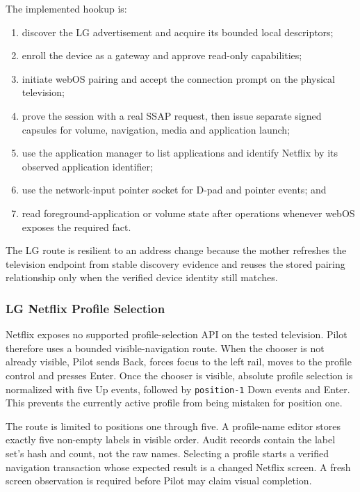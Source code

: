 The implemented hookup is:

\begin{enumerate}
  \item discover the LG advertisement and acquire its bounded local descriptors;
  \item enroll the device as a gateway and approve read-only capabilities;
  \item initiate webOS pairing and accept the connection prompt on the physical
        television;
  \item prove the session with a real SSAP request, then issue separate signed
        capsules for volume, navigation, media and application launch;
  \item use the application manager to list applications and identify Netflix by
        its observed application identifier;
  \item use the network-input pointer socket for D-pad and pointer events; and
  \item read foreground-application or volume state after operations whenever
        webOS exposes the required fact.
\end{enumerate}

The LG route is resilient to an address change because the mother refreshes the
television endpoint from stable discovery evidence and reuses the stored pairing
relationship only when the verified device identity still matches.

\subsubsection{LG Netflix Profile Selection}

Netflix exposes no supported profile-selection API on the tested television.
Pilot therefore uses a bounded visible-navigation route. When the chooser is not
already visible, Pilot sends Back, forces focus to the left rail, moves to the
profile control and presses Enter. Once the chooser is visible, absolute profile
selection is normalized with five Up events, followed by
\texttt{position-1} Down events and Enter. This prevents the currently active
profile from being mistaken for position one.

The route is limited to positions one through five. A profile-name editor stores
exactly five non-empty labels in visible order. Audit records contain the label
set's hash and count, not the raw names. Selecting a profile starts a verified
navigation transaction whose expected result is a changed Netflix screen. A
fresh screen observation is required before Pilot may claim visual completion.

